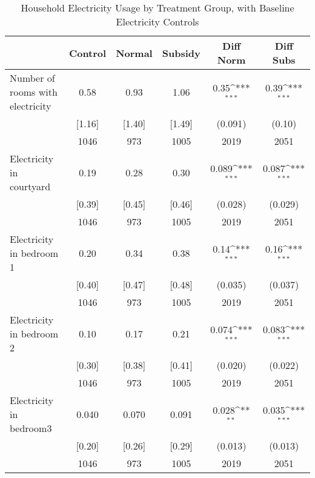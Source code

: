\begin{table}[htbp]\centering
\def\sym#1{\ifmmode^{#1}\else\(^{#1}\)\fi}
\caption{Household Electricity Usage by Treatment Group, with Baseline Electricity Controls \label{tab:"balance"}}
\begin{tabular*}{0.9\hsize}{@{\hskip\tabcolsep\extracolsep\fill}l*{1}{ccccc}}
\toprule
                                &  Control&   Normal&  Subsidy&Diff Norm         &Diff Subs         \\
\midrule
Number of rooms with electricity&     0.58&     0.93&     1.06&     0.35\sym{***}&     0.39\sym{***}\\
                                &   [1.16]&   [1.40]&   [1.49]&  (0.091)         &   (0.10)         \\
                                &     1046&      973&     1005&     2019         &     2051         \\
Electricity in courtyard        &     0.19&     0.28&     0.30&    0.089\sym{***}&    0.087\sym{***}\\
                                &   [0.39]&   [0.45]&   [0.46]&  (0.028)         &  (0.029)         \\
                                &     1046&      973&     1005&     2019         &     2051         \\
Electricity in bedroom 1        &     0.20&     0.34&     0.38&     0.14\sym{***}&     0.16\sym{***}\\
                                &   [0.40]&   [0.47]&   [0.48]&  (0.035)         &  (0.037)         \\
                                &     1046&      973&     1005&     2019         &     2051         \\
Electricity in bedroom 2        &     0.10&     0.17&     0.21&    0.074\sym{***}&    0.083\sym{***}\\
                                &   [0.30]&   [0.38]&   [0.41]&  (0.020)         &  (0.022)         \\
                                &     1046&      973&     1005&     2019         &     2051         \\
Electricity in bedroom3         &    0.040&    0.070&    0.091&    0.028\sym{**} &    0.035\sym{***}\\
                                &   [0.20]&   [0.26]&   [0.29]&  (0.013)         &  (0.013)         \\
                                &     1046&      973&     1005&     2019         &     2051         \\

\end{tabular*}
\end{table}
